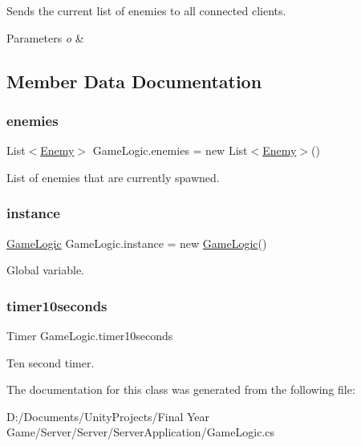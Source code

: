 Sends the current list of enemies to all connected clients. 


\begin{DoxyParams}{Parameters}
{\em o} & \\
\hline
\end{DoxyParams}


\subsection{Member Data Documentation}
\mbox{\label{class_game_logic_a6545efc0f0cde3c2227195d7d74a2140}} 
\subsubsection{\texorpdfstring{enemies}{enemies}}
{\footnotesize\ttfamily List$<$\mbox{\hyperlink{class_enemy}{Enemy}}$>$ Game\+Logic.\+enemies = new List$<$\mbox{\hyperlink{class_enemy}{Enemy}}$>$()\hspace{0.3cm}{\ttfamily [private]}}



List of enemies that are currently spawned. 

\mbox{\label{class_game_logic_a96f4021dff11e0f67601a58893aafdff}} 
\subsubsection{\texorpdfstring{instance}{instance}}
{\footnotesize\ttfamily \mbox{\hyperlink{class_game_logic}{Game\+Logic}} Game\+Logic.\+instance = new \mbox{\hyperlink{class_game_logic}{Game\+Logic}}()\hspace{0.3cm}{\ttfamily [static]}}



Global variable. 

\mbox{\label{class_game_logic_a06a60d253f3ee354c41747c6269c9e0c}} 
\subsubsection{\texorpdfstring{timer10seconds}{timer10seconds}}
{\footnotesize\ttfamily Timer Game\+Logic.\+timer10seconds}



Ten second timer. 



The documentation for this class was generated from the following file\+:\begin{DoxyCompactItemize}
\item 
D\+:/\+Documents/\+Unity\+Projects/\+Final Year Game/\+Server/\+Server/\+Server\+Application/Game\+Logic.\+cs\end{DoxyCompactItemize}

